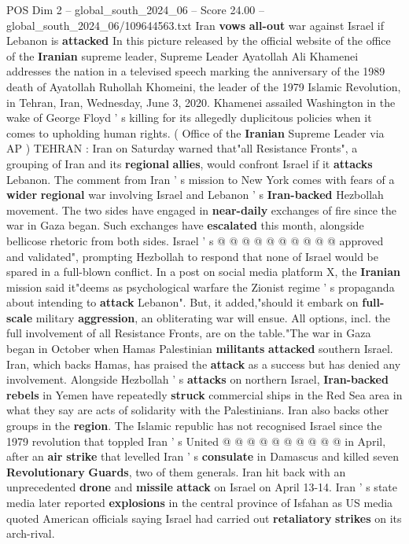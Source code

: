 \begin{textsample}{POS Dim 2 – global\_south\_2024\_06 – Score 24.00 – global\_south\_2024\_06/109644563.txt}  \label{ex:f2_pos_113}
Iran \textbf{vows} \textbf{all-out} war against Israel if Lebanon is \textbf{attacked} In this picture released by the official website of the office of the \textbf{Iranian} supreme leader, Supreme Leader Ayatollah Ali Khamenei addresses the nation in a televised speech marking the anniversary of the 1989 death of Ayatollah Ruhollah Khomeini, the leader of the 1979 Islamic Revolution, in Tehran, Iran, Wednesday, June 3, 2020.
Khamenei assailed Washington in the wake of George Floyd ' s killing for its allegedly duplicitous policies when it comes to upholding human rights. ( Office of the \textbf{Iranian} Supreme Leader via AP ) TEHRAN : Iran on Saturday warned that"all Resistance Fronts", a grouping of Iran and its \textbf{regional} \textbf{allies}, would confront Israel if it \textbf{attacks} Lebanon.
The comment from Iran ' s mission to New York comes with fears of a \textbf{wider} \textbf{regional} war involving Israel and Lebanon ' s \textbf{Iran-backed} Hezbollah movement.
The two sides have engaged in \textbf{near-daily} exchanges of fire since the war in Gaza began.
Such exchanges have \textbf{escalated} this month, alongside bellicose rhetoric from both sides.
Israel ' s @ @ @ @ @ @ @ @ @ @ approved and validated", prompting Hezbollah to respond that none of Israel would be spared in a full-blown conflict.
In a post on social media platform X, the \textbf{Iranian} mission said it"deems as psychological warfare the Zionist regime ' s propaganda about intending to \textbf{attack} Lebanon".
But, it added,"should it embark on \textbf{full-scale} military \textbf{aggression}, an obliterating war will ensue.
All options, incl. the full involvement of all Resistance Fronts, are on the table."The war in Gaza began in October when Hamas Palestinian \textbf{militants} \textbf{attacked} southern Israel.
Iran, which backs Hamas, has praised the \textbf{attack} as a success but has denied any involvement.
Alongside Hezbollah ' s \textbf{attacks} on northern Israel, \textbf{Iran-backed} \textbf{rebels} in Yemen have repeatedly \textbf{struck} commercial ships in the Red Sea area in what they say are acts of solidarity with the Palestinians.
Iran also backs other groups in the \textbf{region}.
The Islamic republic has not recognised Israel since the 1979 revolution that toppled Iran ' s United @ @ @ @ @ @ @ @ @ @ in April, after an \textbf{air} \textbf{strike} that levelled Iran ' s \textbf{consulate} in Damascus and killed seven \textbf{Revolutionary} \textbf{Guards}, two of them generals.
Iran hit back with an unprecedented \textbf{drone} and \textbf{missile} \textbf{attack} on Israel on April 13-14.
Iran ' s state media later reported \textbf{explosions} in the central province of Isfahan as US media quoted American officials saying Israel had carried out \textbf{retaliatory} \textbf{strikes} on its arch-rival.

\end{textsample}
